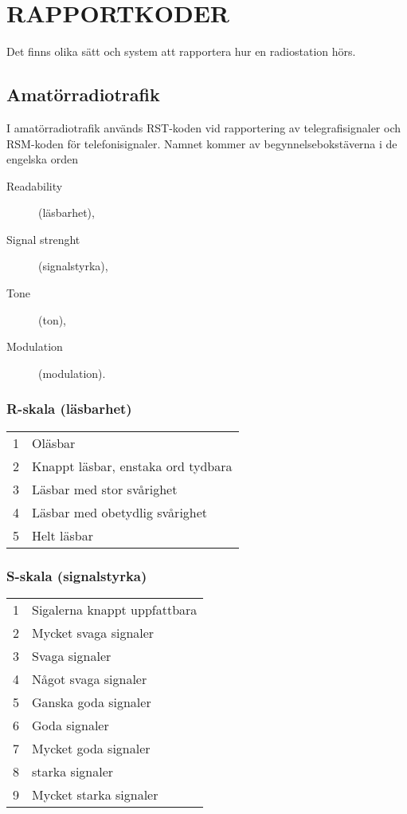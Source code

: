 \chapter{RAPPORTKODER}

Det finns olika sätt och system att rapportera hur en radiostation hörs.

\section{Amatörradiotrafik}

I amatörradiotrafik används RST-koden vid rapportering av
telegrafisignaler och RSM-koden för telefonisignaler. Namnet kommer av
begynnelsebokstäverna i de engelska orden

\begin{description}
  \item[Readability] (läsbarhet),
  \item[Signal strenght] (signalstyrka),
  \item[Tone] (ton),
  \item[Modulation] (modulation).
\end{description}

\subsection{R-skala (läsbarhet)}

\begin{tabular}{p{}p{}}
1 & Oläsbar \\
2 & Knappt läsbar, enstaka ord tydbara \\
3 & Läsbar med stor svårighet \\
4 & Läsbar med obetydlig svårighet \\
5 & Helt läsbar \\
\end{tabular}

\subsection{S-skala (signalstyrka)}

\begin{tabular}{p{}p{}}
1 & Sigalerna knappt uppfattbara \\
2 & Mycket svaga signaler \\
3 & Svaga signaler \\
4 & Något svaga signaler \\
5 & Ganska goda signaler \\
6 & Goda signaler \\
7 & Mycket goda signaler \\
8 & starka signaler \\
9 & Mycket starka signaler \\
\end{tabular}

